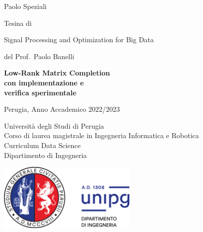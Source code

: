 \documentclass[12pt,a4paper]{report}
\begin{document}
\begin{titlepage}

{\Large \noindent Paolo Speziali} \newline

\vspace{1cm}

{\begin{flushleft}

  {\normalsize \noindent Tesina di}
  \vspace{0.2cm}
  
  {\Large \noindent Signal Processing and Optimization for Big Data}

  \vspace{0.2cm}
  
  {\large \noindent del Prof.~Paolo Banelli}

  \vspace{2cm}

  \fontsize{21.8}{26.16} \selectfont \bfseries \noindent 
  Low-Rank Matrix Completion \\
  con implementazione e \\ 
  verifica sperimentale \\
  \end{flushleft}}
  
  \vspace{4cm}


\noindent Perugia, Anno Accademico 2022/2023

\noindent Università degli Studi di Perugia \\
Corso di laurea magistrale in Ingegneria Informatica e Robotica \\
Curriculum Data Science \\
Dipartimento di Ingegneria

\vspace{0.7cm}

\noindent \includegraphics[width=0.5\textwidth]{Figures/logounipg2021}
\restoregeometry
\end{titlepage}
\normalfont
\newpage \thispagestyle{empty} \ \newpage
\onehalfspacing
\tableofcontents
\end{document}
